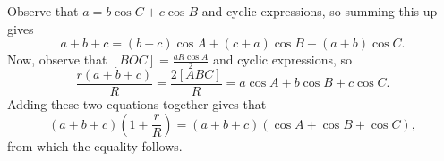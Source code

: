 Observe that $a=b\cos C+c\cos B$ and cyclic expressions, so summing this up gives \[a+b+c=\left(b+c\right)\cos A+\left(c+a\right)\cos B+\left(a+b\right)\cos C.\] Now, observe that $\left[BOC\right]=\frac{aR\cos A}{2}$ and cyclic expressions, so \[\frac{r\left(a+b+c\right)}{R}=\frac{2\left[ABC\right]}{R}=a\cos A+b\cos B+c\cos C.\] Adding these two equations together gives that \[\left(a+b+c\right)\left(1+\frac{r}{R}\right)=\left(a+b+c\right)\left(\cos A+\cos B+\cos C\right),\] from which the equality follows.